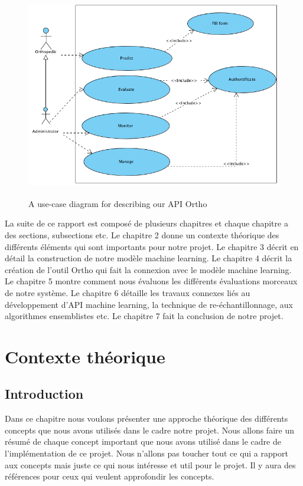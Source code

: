 \documentclass[12pt, french]{report}
\begin{document}
\begin{figure}[h]
	\includegraphics[width=17cm, height =9cm]{images/UseCaseDiag.png}
	\caption{A use-case diagram for describing our API Ortho}
	\label{usecase}
\end{figure} 

La suite de ce rapport est composé de plusieurs chapitres et chaque chapitre a des sections, subsections etc. Le chapitre 2 donne un contexte théorique des différents éléments qui sont importants pour notre projet. Le chapitre 3 décrit en détail la construction de notre modèle machine learning. Le chapitre 4 décrit la création de l'outil Ortho qui fait la connexion avec le modèle machine learning. Le chapitre 5 montre comment nous évaluons les différents évaluations morceaux de notre système. Le chapitre 6 détaille les travaux connexes liés au développement d'API machine learning, la technique de re-échantillonnage, aux algorithmes ensemblistes etc. Le chapitre 7 fait la conclusion de notre projet.


\newpage

\chapter{Contexte théorique}
\section{Introduction}

Dans ce chapitre nous voulons présenter une approche théorique des différents concepts que nous avons utilisés dans le cadre notre projet. Nous allons faire un résumé de chaque concept important que nous avons utilisé dans le cadre de l'implémentation de ce projet. Nous n'allons pas toucher tout ce qui a rapport aux concepts mais juste ce qui nous intéresse et util pour le projet. Il y aura des références pour ceux qui veulent approfondir les concepts. 
\end{document}
